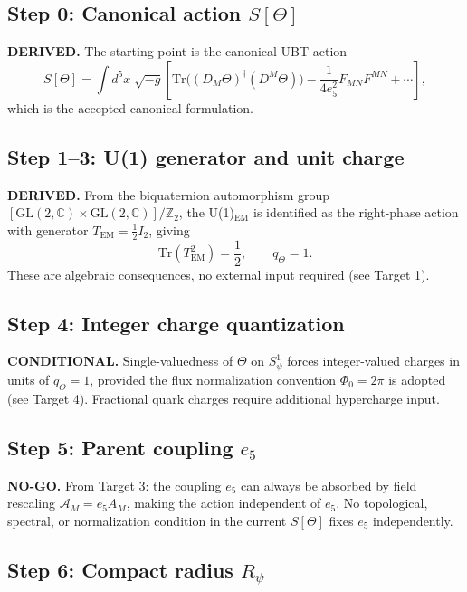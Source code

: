\documentclass[11pt,a4paper]{article}
\begin{document}
\subsection{Step 0: Canonical action $S[\Theta]$}

\textbf{DERIVED.}
The starting point is the canonical UBT action
\begin{equation}
  S[\Theta]=\int d^5x\;\sqrt{-g}\left[
    \mathrm{Tr}\!\big((D_M\Theta)^\dagger(D^M\Theta)\big)
    -\frac{1}{4e_5^2}F_{MN}F^{MN}+\cdots
  \right],
\end{equation}
which is the accepted canonical formulation.

\subsection{Step 1--3: U(1) generator and unit charge}

\textbf{DERIVED.}
From the biquaternion automorphism group
$[\mathrm{GL}(2,\mathbb{C})\times\mathrm{GL}(2,\mathbb{C})]/\mathbb{Z}_2$,
the U(1)$_\mathrm{EM}$ is identified as the right-phase action with generator
$T_\mathrm{EM}=\tfrac{1}{2}I_2$, giving
\begin{equation}
  \mathrm{Tr}(T_\mathrm{EM}^2)=\frac{1}{2},\qquad q_\Theta=1.
\end{equation}
These are algebraic consequences, no external input required (see Target 1).

\subsection{Step 4: Integer charge quantization}

\textbf{CONDITIONAL.}
Single-valuedness of $\Theta$ on $S^1_\psi$ forces integer-valued charges in
units of $q_\Theta=1$, provided the flux normalization convention $\Phi_0=2\pi$
is adopted (see Target 4).  Fractional quark charges require additional
hypercharge input.

\subsection{Step 5: Parent coupling $e_5$}

\textbf{NO-GO.}
From Target 3: the coupling $e_5$ can always be absorbed by field rescaling
$\mathcal{A}_M=e_5 A_M$, making the action independent of $e_5$.  No
topological, spectral, or normalization condition in the current $S[\Theta]$
fixes $e_5$ independently.

\subsection{Step 6: Compact radius $R_\psi$}
\end{document}
